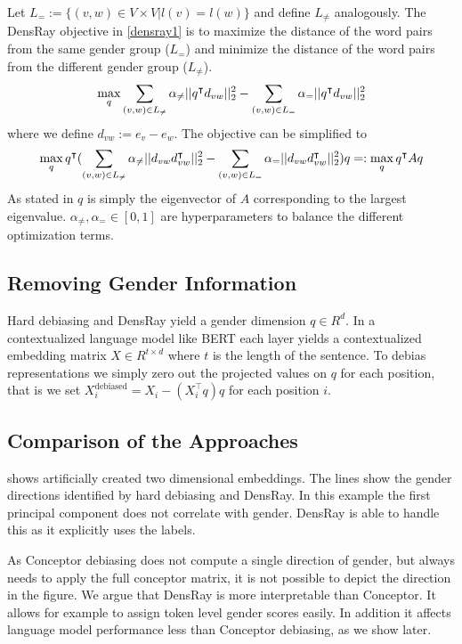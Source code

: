 Let $L_{=}:=\{(v,w)\in V\times V|l(v)=l(w)\}$ and define
$L_{\neq}$ analogously.  The DensRay objective
in \eqref{densray1} is to maximize the distance of the word
pairs from the same gender group ($L_{=}$) and minimize the
distance of the word pairs from the different gender group
($L_{\neq}$).
\begin{eqnarray}
\max\limits_{q} 
\sum_{(v,w)\in L_{\neq}}\alpha_{\neq}||q^\intercal d_{vw}||^2_2
-\sum_{(v,w)\in L_{=}}\alpha_{=}||q^\intercal d_{vw}||^2_2
\eqlabel{densray1}
\end{eqnarray}
where we define $d_{vw}:=e_v-e_w$. The objective can be simplified to 
\begin{eqnarray}
\max \limits_{q} q^\intercal(
\sum_{(v,w)\in L_{\neq}}\alpha_{\neq}||d_{vw}d_{vw}^\intercal ||^2_2-\sum_{(v,w)\in L_{=}}\alpha_{=}||d_{vw}d_{vw}^\intercal ||^2_2)q=:\max\limits_{q} q^\intercal Aq
\eqlabel{eq:densray2}
\end{eqnarray}
As stated in \cite{dufter2019analytical} $q$ is simply the eigenvector of $A$ corresponding to the largest eigenvalue.
$\alpha_{\neq},\alpha_{=}\in [0,1]$ are hyperparameters to balance the different optimization terms.

\subsection{Removing Gender Information}

Hard debiasing and DensRay yield a gender dimension $q \in R^d$. In a contextualized language model like BERT each layer yields a contextualized embedding matrix $X \in R^{t \times d}$ where $t$ is the length of the sentence. To debias representations we simply zero out the projected values on $q$ for each position, that is we set $X^{\text{debiased}}_i = X_i -  (X_i^\intercal q) q$ for each position $i$.


\subsection{Comparison of the Approaches}
  shows artificially created two dimensional embeddings. The lines show the gender directions identified by hard debiasing and DensRay. In this example
 the first principal component does not correlate with gender. DensRay is able to handle this as it explicitly uses the labels.
 
As Conceptor debiasing does not compute a single direction of gender, but always needs to apply the full conceptor matrix, it is not possible to depict the direction in the figure. 
We argue that DensRay is more interpretable than Conceptor. It allows for example to assign token level gender scores easily. In addition it affects language model performance less than Conceptor debiasing, as we show later.
 
